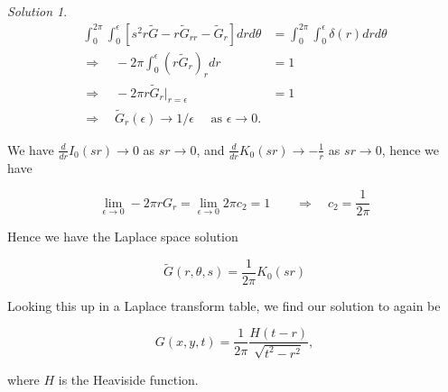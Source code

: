 \documentclass[12pt,a4paper]{article}
\theoremstyle{definition}
\theoremstyle{remark}
\newtheorem*{solution}{Solution}
\begin{document}
\begin{enumerate}[(a)]
\begin{solution}
        \begin{align*}
            \int_0^{2\pi} \int_0^\epsilon [s^2 r \tilde G - r \tilde G_{rr} - \tilde G_r] dr d\theta &= \int_0^{2\pi} \int_0^\epsilon \delta(r) dr d\theta \\
            \Rightarrow \quad -2\pi \int_0^\epsilon (r\tilde G_r)_r dr &= 1 \\
            \Rightarrow \quad -2\pi r \tilde G_r\big|_{r=\epsilon} &= 1 \\
            \Rightarrow \quad \tilde G_r(\epsilon) \rightarrow 1/\epsilon \quad \text{ as $\epsilon \rightarrow 0$.}
        \end{align*}

        We have $\frac{d}{dr} I_0(sr) \rightarrow 0$ as $sr \rightarrow 0$, and $ \frac{d}{dr} K_0(sr) \rightarrow - \frac{1}{r}$ as $sr \rightarrow 0$, hence we have

        $$\lim_{\epsilon \rightarrow 0} -2 \pi r G_r = \lim_{\epsilon \rightarrow 0} 2 \pi c_2 = 1 \qquad \Rightarrow  \quad c_2 = \frac{1}{2\pi}$$

        Hence we have the Laplace space solution 

        $$\tilde G(r, \theta, s) = \frac{1}{2\pi} K_0(sr)$$

        Looking this up in a Laplace transform table, we find our solution to again be 

        $$G(x,y,t) = \frac{1}{2\pi} \frac{H(t-r)}{\sqrt{t^2-r^2}},$$

        where $H$ is the Heaviside function. 
    \end{solution}
\end{enumerate}
\end{document}
